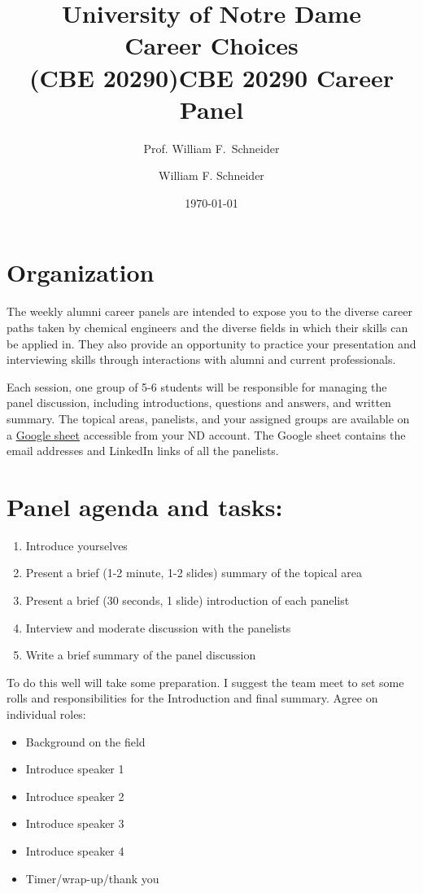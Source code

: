 \documentclass[11pt]{article}
\title{University of Notre Dame\\Career Choices\\(CBE 20290)}
\author{Prof. William F.\ Schneider}
\author{William F. Schneider}
\date{\today}
\title{CBE 20290 Career Panel}
\begin{document}
\begin{OPTIONS}
\end{OPTIONS}

\section{Organization}
\label{sec:org0d6c767}
The weekly alumni career panels are intended to expose you to the diverse career paths taken by chemical engineers and  the diverse fields in which their skills can be applied in. They also provide an opportunity to practice your presentation and interviewing skills through interactions with alumni and current professionals.

Each session, one group of 5-6 students will be responsible for managing the panel discussion, including introductions, questions and answers, and written summary. The topical areas, panelists, and your assigned groups  are available on a  \href{https://docs.google.com/spreadsheets/d/1IFn56\_q2D8sfBdZx9Idm4Pvy1nI8MEQJUamCiiHcFkE/edit?usp=sharing}{Google sheet} accessible from your ND account.  The Google sheet contains the email addresses and LinkedIn links of all the panelists.

\section{Panel agenda and tasks:}
\label{sec:orgdf06564}
\begin{enumerate}
\item Introduce yourselves
\item Present a brief (1-2  minute, 1-2 slides) summary of the topical area
\item Present a brief (30 seconds, 1 slide) introduction of each panelist
\item Interview and moderate discussion with the panelists
\item Write a brief summary of the panel discussion
\end{enumerate}

To do this well will take some preparation. I suggest the team meet to set some rolls and responsibilities for the Introduction and final summary. Agree on individual roles:
\begin{itemize}
\item Background on the field
\item Introduce speaker 1
\item Introduce speaker 2
\item Introduce speaker 3
\item Introduce speaker 4
\item Timer/wrap-up/thank you
\end{itemize}
\end{document}
